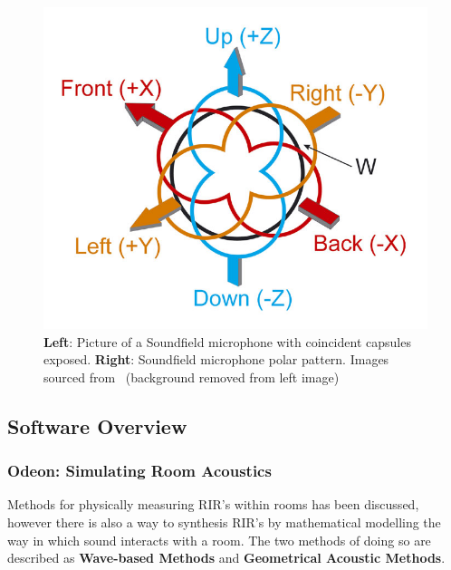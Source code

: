 \documentclass[../../main.tex]{subfiles}
\begin{document}
\begin{figure}[ht]
\begin{minipage}{0.5\textwidth}
				\center\includegraphics[scale = 0.3]{Sections/Background/images/soundFieldPolar.jpg}
			\end{minipage}
			\caption{\textbf{Left}: Picture of a Soundfield microphone with coincident capsules exposed. \textbf{Right}: Soundfield microphone polar pattern. Images sourced from~\cite{soundfieldMic} (background removed from left image) }
			\label{sfMic}
		\end{figure}

	\subsection{Software Overview}

		\subsubsection{Odeon: Simulating Room Acoustics}
		\label{Software:Odeon}

			Methods for physically measuring \ac{RIR}'s within rooms has been discussed, however there is also a way to synthesis \ac{RIR}'s by mathematical modelling the way in which sound interacts with a room. The two methods of doing so are described as \textbf{Wave-based Methods} and \textbf{Geometrical Acoustic Methods}.
\end{document}
